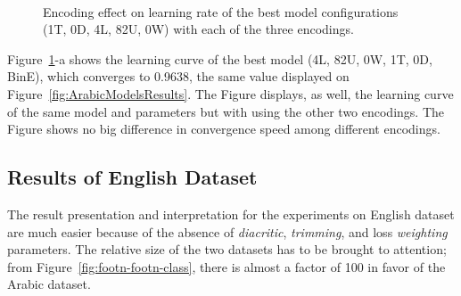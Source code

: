 \documentclass[journal,10pt,twocolumns,letter]{IEEEtran}
\begin{document}
\begin{figure}[!tb]
  \caption{Encoding effect on learning rate of the best model configurations (1T, 0D, 4L, 82U, 0W)
    with each of the three encodings.}~\label{fig:ConvergenceMemory}
\end{figure}
Figure~\ref{fig:ConvergenceMemory}-a shows the learning curve of the best model (4L, 82U, 0W, 1T,
0D, BinE), which converges to 0.9638, the same value displayed on
Figure~\ref{fig:ArabicModelsResults}. The Figure displays, as well, the learning curve of the same
model and parameters but with using the other two encodings. The Figure shows no big difference in
convergence speed among different encodings.


\subsection{Results of English Dataset}\label{sec:english-results}
The result presentation and interpretation for the experiments on English dataset are much easier
because of the absence of \textit{diacritic}, \textit{trimming}, and loss \textit{weighting}
parameters. The relative size of the two datasets has to be brought to attention; from
Figure~\ref{fig:footn-footn-class}, there is almost a factor of 100 in favor of the Arabic dataset.

\bigskip
\end{document}
